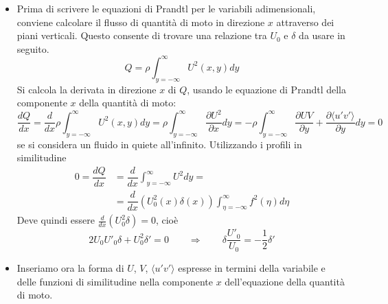 \begin{itemize}
\item Prima di scrivere le equazioni di Prandtl per le variabili
 adimensionali, conviene calcolare il flusso di quantità di moto
 in direzione $x$ attraverso dei piani verticali. Questo consente
 di trovare una relazione tra $U_0$ e $\delta$ da usare in seguito.
 \begin{equation}
  Q = \rho \int_{y=-\infty}^\infty U^2(x,y) dy
 \end{equation}
 Si calcola la derivata in direzione $x$ di $Q$, usando le equazione
 di Prandtl della componente $x$ della quantità di moto:
\begin{equation}
 \dfrac{d Q}{d x}=\dfrac{d}{d x}\rho \int_{y=-\infty}^\infty U^2(x,y) dy = 
  \rho \int_{y=-\infty}^\infty \dfrac{\partial U^2}{\partial x} dy =
  -\rho \int_{y=-\infty}^\infty \dfrac{\partial UV}{\partial y} 
  + \dfrac{\partial \langle u'v' \rangle}{\partial y} dy = 0
\end{equation}
 se si considera un fluido in quiete all'infinito.
 Utilizzando i profili in similitudine
\begin{equation}
\begin{aligned}
 0 = \dfrac{d Q}{d x} & = 
  \dfrac{d}{dx} \int_{y=-\infty}^\infty  U^2 dy = \\ 
& = \dfrac{d}{dx} \left( U^2_0(x) \delta(x) \right)
   \int_{\eta=-\infty}^{\infty} f^2(\eta)d\eta
\end{aligned}
\end{equation}
Deve quindi essere $ \frac{d}{dx}(U_0^2 \delta)= 0$, cioè
\begin{equation}
 2 U_0 U'_0 \delta + U^2_0 \delta' = 0 \qquad \Rightarrow \qquad
 \delta\dfrac{U'_0}{U_0} = -\dfrac{1}{2}\delta'
\end{equation}

\item Inseriamo ora la forma di $U$, $V$, $\langle u'v' \rangle$ 
 espresse in termini della variabile e delle funzioni di similitudine
 nella componente $x$ dell'equazione della quantità di moto.


\end{itemize}
